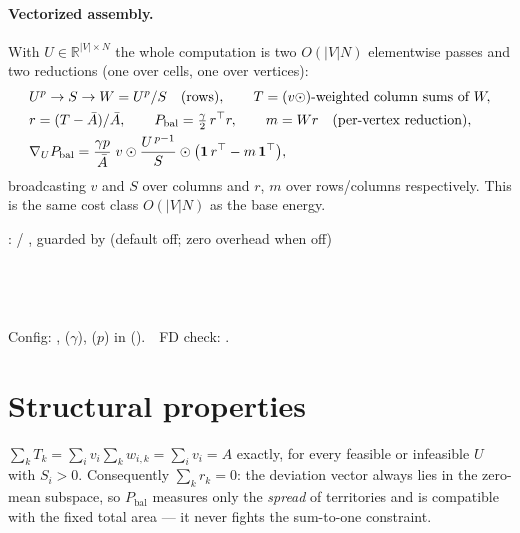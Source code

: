 \documentclass[11pt,a4paper]{article}
\begin{document}
\paragraph{Vectorized assembly.}
With $U\in\mathbb{R}^{|V|\times N}$ the whole computation is two $O(|V|N)$
elementwise passes and two reductions (one over cells, one over vertices):
\begin{align*}
  &U^p \to S \to W = U^p / S
  \quad\text{(rows)},\qquad
  T = (v \odot) \text{-weighted column sums of } W,\\
  &r = (T-\bar{A})/\bar{A},\qquad
  P_{\mathrm{bal}} = \tfrac\gamma2\, r^\top r,\qquad
  m = W r \quad\text{(per-vertex reduction)},\\
  &\nabla_U P_{\mathrm{bal}}
   = \frac{\gamma p}{\bar{A}}\; v \odot \frac{U^{\,p-1}}{S}
     \odot \bigl(\mathbf 1\, r^\top - m\,\mathbf 1^\top\bigr),
\end{align*}
broadcasting $v$ and $S$ over columns and $r$, $m$ over rows/columns
respectively. This is the same cost class $O(|V|N)$ as the base energy.

\begin{tcolorbox}[colback=blue!4!white, colframe=blue!40!black,
                  title={Code: WTA balance term and gradient}, fontupper=\small]
:
 / , guarded by
 (default off; zero overhead when off)\\[2pt]
\\
\\
\\
\\[2pt]
Config: ,  ($\gamma$),
 ($p$) in 
().\ \
FD check: .
\end{tcolorbox}

\section{Structural properties}
\label{sec:props}

\begin{prop}
\label{prop:consistency}
$\displaystyle\sum_k T_k = \sum_i v_i \sum_k w_{i,k} = \sum_i v_i = A$
exactly, for every feasible or infeasible $U$ with $S_i>0$. Consequently
$\sum_k r_k = 0$: the deviation vector always lies in the zero-mean subspace,
so $P_{\mathrm{bal}}$ measures only the \emph{spread} of territories and is
compatible with the fixed total area — it never fights the sum-to-one
constraint.
\end{prop}
\end{document}
